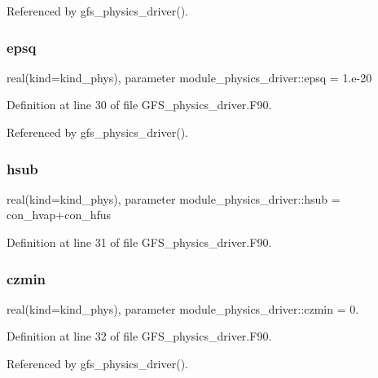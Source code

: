 Referenced by gfs\+\_\+physics\+\_\+driver().

\mbox{\label{namespacemodule__physics__driver_a7d7dfe680f6f4322f36d8e229a9a26f8}} 
\subsubsection{epsq}
{\footnotesize\ttfamily real(kind=kind\+\_\+phys), parameter module\+\_\+physics\+\_\+driver\+::epsq = 1.e-\/20}



Definition at line 30 of file G\+F\+S\+\_\+physics\+\_\+driver.\+F90.



Referenced by gfs\+\_\+physics\+\_\+driver().

\mbox{\label{namespacemodule__physics__driver_ac96914a07b4ef634511dad300c479600}} 
\subsubsection{hsub}
{\footnotesize\ttfamily real(kind=kind\+\_\+phys), parameter module\+\_\+physics\+\_\+driver\+::hsub = con\+\_\+hvap+con\+\_\+hfus}



Definition at line 31 of file G\+F\+S\+\_\+physics\+\_\+driver.\+F90.

\mbox{\label{namespacemodule__physics__driver_ac1c4adf593ccaf8bb5517c54bd93e197}} 
\subsubsection{czmin}
{\footnotesize\ttfamily real(kind=kind\+\_\+phys), parameter module\+\_\+physics\+\_\+driver\+::czmin = 0.}



Definition at line 32 of file G\+F\+S\+\_\+physics\+\_\+driver.\+F90.



Referenced by gfs\+\_\+physics\+\_\+driver().

\mbox{\label{namespacemodule__physics__driver_ab8fc037a8258ae30d8fc68c743ed6392}} 
